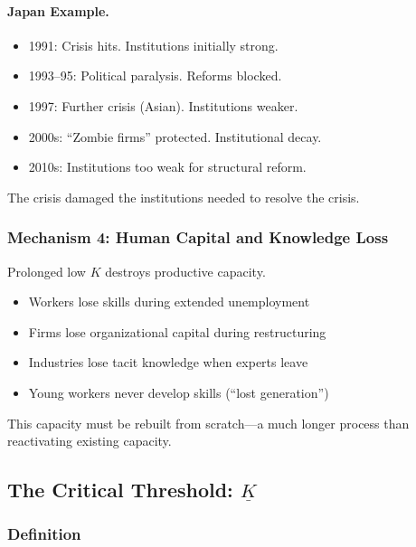 \paragraph{Japan Example.}
\begin{itemize}
    \item 1991: Crisis hits. Institutions initially strong.
    \item 1993--95: Political paralysis. Reforms blocked.
    \item 1997: Further crisis (Asian). Institutions weaker.
    \item 2000s: ``Zombie firms'' protected. Institutional decay.
    \item 2010s: Institutions too weak for structural reform.
\end{itemize}

The crisis damaged the institutions needed to resolve the crisis.

\subsubsection{Mechanism 4: Human Capital and Knowledge Loss}

Prolonged low $K$ destroys productive capacity.

\begin{itemize}
    \item Workers lose skills during extended unemployment
    \item Firms lose organizational capital during restructuring
    \item Industries lose tacit knowledge when experts leave
    \item Young workers never develop skills (``lost generation'')
\end{itemize}

This capacity must be rebuilt from scratch---a much longer process than 
reactivating existing capacity.

\subsection{The Critical Threshold: $\underline{K}$}

\subsubsection{Definition}

